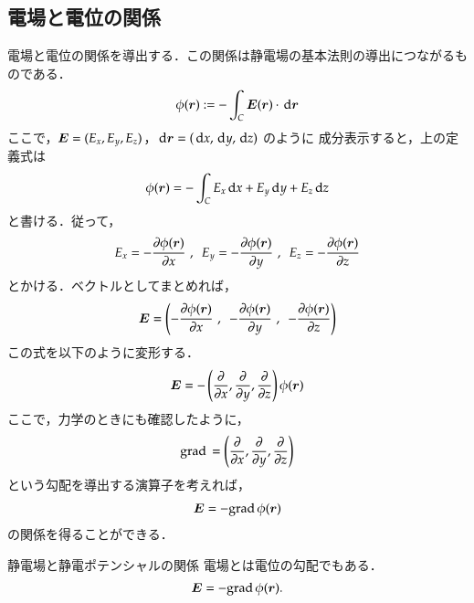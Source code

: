         \subsection{電場と電位の関係}
            電場と電位の関係を導出する．この関係は静電場の基本法則の導出につながるものである．
            \begin{align}
            \phi(\boldsymbol{r}) := -\int_{C} \boldsymbol{E}(\boldsymbol{r}) \cdot \,\mathrm{d}\boldsymbol{r}
            \end{align}
            ここで，$\boldsymbol{E}=(E_{x},E_{y},E_{z})$，$\,\mathrm{d}\boldsymbol{r}=(\,\mathrm{d} x,\,\mathrm{d} y,\,\mathrm{d} z)$ のように
            成分表示すると，上の定義式は
                \begin{align}
                    \phi(\boldsymbol{r})
                    =-\int_{C} E_{x}\,\mathrm{d} x+E_{y}\,\mathrm{d} y+E_{z}\,\mathrm{d} z
                \end{align}
            と書ける．従って，
                \begin{align}
                    E_{x}=-\frac{\partial \phi(\boldsymbol{r})}{\partial x} \,\,,
                    \,\,\,E_{y}=-\frac{\partial \phi(\boldsymbol{r})}{\partial y} \,\,,
                    \,\,\,E_{z}=-\frac{\partial \phi(\boldsymbol{r})}{\partial z}
                \end{align}
            とかける．ベクトルとしてまとめれば，
                \begin{align}
                    \boldsymbol{E}
                    =\left(-\frac{\partial \phi(\boldsymbol{r})}{\partial x}\,\,,
                    \,\,\,-\frac{\partial \phi(\boldsymbol{r})}{\partial y}\,\,,
                    \,\,\,-\frac{\partial \phi(\boldsymbol{r})}{\partial z}
                            \right)
                \end{align}
            この式を以下のように変形する．
                \begin{align}
                    \boldsymbol{E}
                    =-\left(\frac{\partial}{\partial x},
                      \frac{\partial}{\partial y} ,
                      \frac{\partial}{\partial z}
                      \right) \phi(\boldsymbol{r})
                \end{align}
            ここで，力学のときにも確認したように，
                \begin{align}
                    \mathrm{grad}\,
                    =\left(\frac{\partial}{\partial x},
                      \frac{\partial}{\partial y} ,
                      \frac{\partial}{\partial z}
                      \right)
                \end{align}
            という勾配を導出する演算子を考えれば，
                \begin{align}
                    \boldsymbol{E} = -\mathrm{grad}\,\phi(\boldsymbol{r})
                \end{align}
            の関係を得ることができる．
                    \begin{myshadebox}{静電場と静電ポテンシャルの関係}
                        電場とは電位の勾配でもある．
                        \begin{align}
                            \boldsymbol{E} = -\mathrm{grad}\,\phi(\boldsymbol{r}).
                        \end{align}
                    \end{myshadebox}

